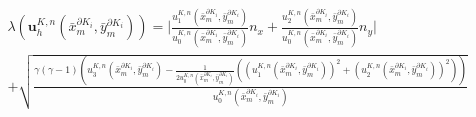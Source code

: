 \documentclass[a4paper, 12pt, UTF8]{ctexart}
\newcommand{\bs}[1]{\boldsymbol{#1}}
\begin{document}
\begin{equation}
\begin{split}
&{\lambda}(\bs u_{h}^{K,n}(\bar{x}_{m}^{\partial K_i}, \bar{y}_{m}^{\partial K_i}))=\Big|\frac{u_1^{K,n}(\bar{x}_{m}^{\partial K_i}, \bar{y}_{m}^{\partial K_i})}{ u_0^{K,n}(\bar{x}_{m}^{\partial K_i}, \bar{y}_{m}^{\partial K_i})}n_x+\frac{ u_2^{K,n}(\bar{x}_{m}^{\partial K_i}, \bar{y}_{m}^{\partial K_i})}{ u_0^{K,n}(\bar{x}_{m}^{\partial K_i}, \bar{y}_{m}^{\partial K_i})}n_y\Big|\\
&+\sqrt{\frac{\gamma (\gamma-1)\left(u_3^{K,n}(\bar{x}_{m}^{\partial K_i}, \bar{y}_{m}^{\partial K_i})-\frac{1}{2{u_0^{K,n}(\bar{x}_{m}^{\partial K_i}, \bar{y}_{m}^{\partial K_i})}} \left(( u_1^{K,n}(\bar{x}_{m}^{\partial K_i}, \bar{y}_{m}^{\partial K_i}))^{2}+(u_{2}^{K,n}(\bar{x}_{m}^{\partial K_i}, \bar{y}_{m}^{\partial K_i}))^{2}\right)\right)}{u_0^{K,n}(\bar{x}_{m}^{\partial K_i}, \bar{y}_{m}^{\partial K_i})}}
\end{split}
\end{equation}
\end{document}
